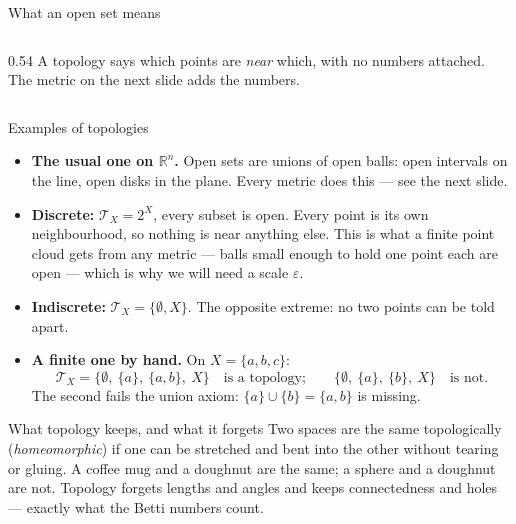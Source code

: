 \documentclass[10pt,aspectratio=169]{beamer}
\newcommand{\R}{\mathbb{R}}
\newcommand{\Tau}{\mathcal{T}}  %
\begin{document}
\begin{frame}[shrink=5]{What an open set means}
\begin{columns}[T,onlytextwidth]
\begin{column}{0.54\textwidth}
                \alert{A topology says which points are \emph{near} which, with no numbers
                attached.} The metric on the next slide adds the numbers.
            \end{column}
        \end{columns}
    \end{frame}

    \begin{frame}[shrink=5]{Examples of topologies}
        \small
        \begin{itemize}
            \item \textbf{The usual one on $\R^n$.} Open sets are unions of open balls:
            open intervals on the line, open disks in the plane. Every metric does this
            --- see the next slide.
            \item \textbf{Discrete:} $\Tau_X=2^X$, every subset is open. Every point is
            its own neighbourhood, so nothing is near anything else. \alert{This is what a
            finite point cloud gets from any metric} --- balls small enough to hold one
            point each are open --- which is why we will need a scale $\varepsilon$.
            \item \textbf{Indiscrete:} $\Tau_X=\{\emptyset, X\}$. The opposite extreme:
            no two points can be told apart.
            \item \textbf{A finite one by hand.} On $X=\{a,b,c\}$:
            \[
                \Tau_X=\bigl\{\emptyset,\ \{a\},\ \{a,b\},\ X\bigr\}
                \quad\text{is a topology;}\qquad
                \bigl\{\emptyset,\ \{a\},\ \{b\},\ X\bigr\}\quad\text{is not.}
            \]
            The second fails the union axiom: $\{a\}\cup\{b\}=\{a,b\}$ is missing.
        \end{itemize}

        \vspace{0.3em}
        \begin{alertblock}{What topology keeps, and what it forgets}
            Two spaces are the same topologically (\emph{homeomorphic}) if one can be
            stretched and bent into the other without tearing or gluing. A coffee mug and
            a doughnut are the same; a sphere and a doughnut are not. Topology forgets
            lengths and angles and keeps connectedness and holes --- exactly what the
            Betti numbers count.
        \end{alertblock}
    \end{frame}
\end{document}
